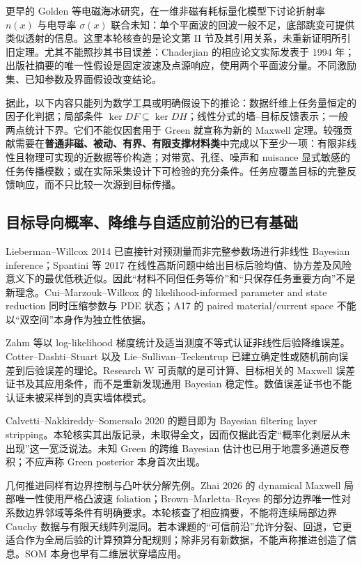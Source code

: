 更早的 Golden 等电磁海冰研究，在一维非磁有耗标量化模型下讨论折射率 $n(x)$ 与电导率 $\sigma(x)$ 联合未知：单个平面波的回波一般不足，底部跳变可提供类似透射的信息\cite{L_Golden}。这里本轮核查的是论文第 II 节及其引用关系，未重新证明所引旧定理。尤其不能照抄其书目误差：Chaderjian 的相应论文实际发表于 1994 年；出版社摘要的唯一性假设是固定波速及点源响应，使用两个平面波分量\cite{L_Chaderjian}。不同激励集、已知参数及界面假设改变结论。

据此，以下内容只能列为数学工具或明确假设下的推论：数据纤维上任务量恒定的因子化判据；局部条件 $\ker DF\subseteq\ker DH$；线性分式的墙--目标反馈表示；一般两点统计下界。它们不能仅因套用于 Green 就宣称为新的 Maxwell 定理。较强贡献需要在\textbf{普通非磁、被动、有界、有限支撑材料类}中完成以下至少一项：有限非线性且物理可实现的近数据等价构造；对带宽、孔径、噪声和 nuisance 显式敏感的任务传播模数；或在实际采集设计下可检验的充分条件。任务应覆盖目标的完整反馈响应，而不只比较一次源到目标传播。

\subsection{目标导向概率、降维与自适应前沿的已有基础}

Lieberman--Willcox 2014 已直接针对预测量而非完整参数场进行非线性 Bayesian inference\cite{L_NonlinearGoal}；Spantini 等 2017 在线性高斯问题中给出目标后验均值、协方差及风险意义下的最优低秩近似\cite{L_Goal}。因此“材料不同但任务等价”和“只保存任务重要方向”不是新理念。Cui--Marzouk--Willcox 的 likelihood-informed parameter and state reduction 同时压缩参数与 PDE 状态\cite{L_Cui}；A17 的 paired material/current space 不能以“双空间”本身作为独立性依据。

Zahm 等以 log-likelihood 梯度统计及适当测度不等式认证非线性后验降维误差\cite{L_Zahm}。Cotter--Dashti--Stuart 以及 Lie--Sullivan--Teckentrup 已建立确定性或随机前向误差到后验误差的理论\cite{L_Cotter,L_Lie}。Research W 可贡献的是可计算、目标相关的 Maxwell 误差证书及其应用条件，而不是重新发现通用 Bayesian 稳定性。数值误差证书也不能认证未被采样到的真实墙体模式。

Calvetti--Nakkireddy--Somersalo 2020 的题目即为 Bayesian filtering layer stripping\cite{L_BayesStrip}。本轮核实其出版记录，未取得全文，因而仅据此否定“概率化剥层从未出现”这一宽泛说法。未知 Green 的跨维 Bayesian 估计也已用于地震多通道反卷积\cite{L_GreenBayes}；不应声称 Green posterior 本身首次出现。

几何推进同样有边界控制与凸叶状分解先例。Zhai 2026 的 dynamical Maxwell 局部唯一性使用严格凸波速 foliation\cite{L_Zhai}；Brown--Marletta--Reyes 的部分边界唯一性对系数边界邻域等条件有明确要求\cite{L_Partial}。本轮核查了相应摘要，不能将连续局部边界 Cauchy 数据与有限天线阵列混同。若本课题的“可信前沿”允许分裂、回退，它更适合作为全局后验的计算预算分配规则；除非另有新数据，不能声称推进创造了信息。SOM 本身也早有二维层状穿墙应用\cite{L_SOM}。

